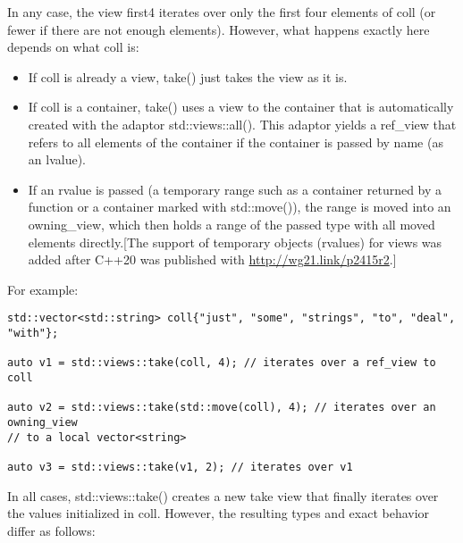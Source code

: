 In any case, the view first4 iterates over only the first four elements of coll (or fewer if there are not enough elements). However, what happens exactly here depends on what coll is:

\begin{itemize}
\item
If coll is already a view, take() just takes the view as it is.

\item
If coll is a container, take() uses a view to the container that is automatically created with the adaptor std::views::all(). This adaptor yields a ref\_view that refers to all elements of the container if the container is passed by name (as an lvalue).

\item
If an rvalue is passed (a temporary range such as a container returned by a function or a container marked with std::move()), the range is moved into an owning\_view, which then holds a range of the passed type with all moved elements directly.[The support of temporary objects (rvalues) for views was added after C++20 was published with \url{http://wg21.link/p2415r2}.]
\end{itemize}

For example:

\begin{lstlisting}[style=styleCXX]
std::vector<std::string> coll{"just", "some", "strings", "to", "deal", "with"};

auto v1 = std::views::take(coll, 4); // iterates over a ref_view to coll

auto v2 = std::views::take(std::move(coll), 4); // iterates over an owning_view
// to a local vector<string>

auto v3 = std::views::take(v1, 2); // iterates over v1
\end{lstlisting}

In all cases, std::views::take() creates a new take view that finally iterates over the values initialized in coll. However, the resulting types and exact behavior differ as follows:

